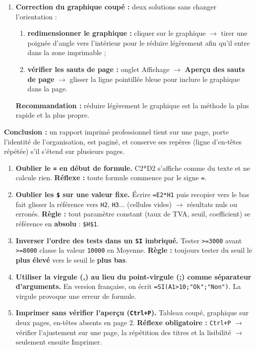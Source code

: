 \documentclass[11pt]{article}
\begin{document}
\begin{exoresolu}
\begin{enumerate}
    \item \textbf{Correction du graphique coupé :} deux solutions sans changer l'orientation :
    \begin{enumerate}
        \item \textbf{redimensionner le graphique :} cliquer sur le graphique $\rightarrow$ tirer une poignée d'angle vers l'intérieur pour le réduire légèrement afin qu'il entre dans la zone imprimable ;
        \item \textbf{vérifier les sauts de page :} onglet Affichage $\rightarrow$ \textbf{Aperçu des sauts de page} $\rightarrow$ glisser la ligne pointillée bleue pour inclure le graphique dans la page.
    \end{enumerate}
    \textbf{Recommandation :} réduire légèrement le graphique est la méthode la plus rapide et la plus propre.
\end{enumerate}
\textbf{Conclusion :} un rapport imprimé professionnel tient sur une page, porte l'identité de l'organisation, est paginé, et conserve ses repères (ligne d'en-têtes répétée) s'il s'étend sur plusieurs pages.
\end{exoresolu}

\begin{attention}
\begin{enumerate}
    \item \textbf{Oublier le \texttt{=} en début de formule.} \og{}C2*D2\fg{} s'affiche comme du texte et ne calcule rien. \textbf{Réflexe :} toute formule commence par le signe \texttt{=}.
    \item \textbf{Oublier les \texttt{\$} sur une valeur fixe.} Écrire \texttt{=E2*H1} puis recopier vers le bas fait glisser la référence vers \texttt{H2}, \texttt{H3}... (cellules vides) $\rightarrow$ résultats nuls ou erronés. \textbf{Règle :} tout paramètre constant (taux de TVA, seuil, coefficient) se référence en \textbf{absolu} : \texttt{\$H\$1}.
    \item \textbf{Inverser l'ordre des tests dans un \texttt{SI} imbriqué.} Tester \texttt{>=3000} avant \texttt{>=8000} classe la valeur \texttt{10000} en \og{}Moyenne\fg{}. \textbf{Règle :} toujours tester du seuil le \textbf{plus élevé} vers le seuil le \textbf{plus bas}.
    \item \textbf{Utiliser la virgule (,) au lieu du point-virgule (;) comme séparateur d'arguments.} En version française, on écrit \texttt{=SI(A1>10;"Ok";"Non")}. La virgule provoque une erreur de formule.
    \item \textbf{Imprimer sans vérifier l'aperçu (\texttt{Ctrl+P}).} Tableau coupé, graphique sur deux pages, en-têtes absents en page 2. \textbf{Réflexe obligatoire :} \texttt{Ctrl+P} $\rightarrow$ vérifier l'ajustement sur une page, la répétition des titres et la lisibilité $\rightarrow$ seulement ensuite Imprimer.
\end{enumerate}
\end{attention}
\end{document}
